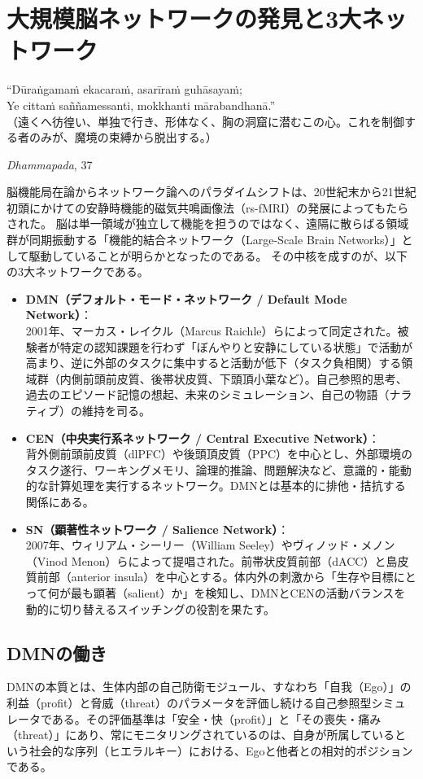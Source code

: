 \chapter{大規模脳ネットワークの発見と3大ネットワーク}
\epigraph{``Dūraṅgamaṁ ekacaraṁ, asarīraṁ guhāsayaṁ;\\
Ye cittaṁ saññamessanti, mokkhanti mārabandhanā.''\\
\small（遠くへ彷徨い、単独で行き、形体なく、胸の洞窟に潜むこの心。これを制御する者のみが、魔境の束縛から脱出する。）}{\textit{Dhammapada}, 37}

脳機能局在論からネットワーク論へのパラダイムシフトは、20世紀末から21世紀初頭にかけての安静時機能的磁気共鳴画像法（rs-fMRI）の発展によってもたらされた。
脳は単一領域が独立して機能を担うのではなく、遠隔に散らばる領域群が同期振動する「機能的結合ネットワーク（Large-Scale Brain Networks）」として駆動していることが明らかとなったのである。
その中核を成すのが、以下の3大ネットワークである。

\begin{itemize}
  \item \textbf{DMN（デフォルト・モード・ネットワーク / Default Mode Network）}：\\
  2001年、マーカス・レイクル（Marcus Raichle）らによって同定された。被験者が特定の認知課題を行わず「ぼんやりと安静にしている状態」で活動が高まり、逆に外部のタスクに集中すると活動が低下（タスク負相関）する領域群（内側前頭前皮質、後帯状皮質、下頭頂小葉など）。自己参照的思考、過去のエピソード記憶の想起、未来のシミュレーション、自己の物語（ナラティブ）の維持を司る。
  \item \textbf{CEN（中央実行系ネットワーク / Central Executive Network）}：\\
  背外側前頭前皮質（dlPFC）や後頭頂皮質（PPC）を中心とし、外部環境のタスク遂行、ワーキングメモリ、論理的推論、問題解決など、意識的・能動的な計算処理を実行するネットワーク。DMNとは基本的に排他・拮抗する関係にある。
  \item \textbf{SN（顕著性ネットワーク / Salience Network）}：\\
  2007年、ウィリアム・シーリー（William Seeley）やヴィノッド・メノン（Vinod Menon）らによって提唱された。前帯状皮質前部（dACC）と島皮質前部（anterior insula）を中心とする。体内外の刺激から「生存や目標にとって何が最も顕著（salient）か」を検知し、DMNとCENの活動バランスを動的に切り替えるスイッチングの役割を果たす。
\end{itemize}

\section{DMNの働き}
\label{section:DMNの働き}
DMNの本質とは、生体内部の自己防衛モジュール、すなわち「自我（Ego）」の利益（profit）と脅威（threat）のパラメータを評価し続ける自己参照型シミュレータである。その評価基準は「安全・快（profit）」と「その喪失・痛み（threat）」にあり、常にモニタリングされているのは、自身が所属しているという社会的な序列（ヒエラルキー）における、Egoと他者との相対的ポジションである。

